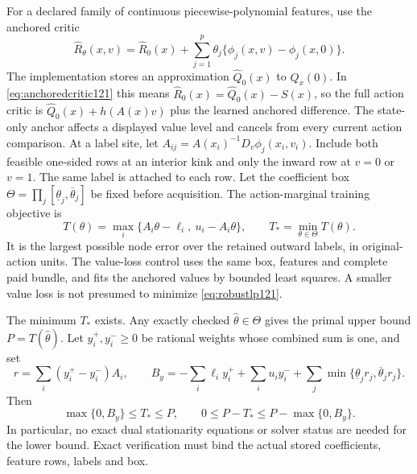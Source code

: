 For a declared family of continuous piecewise-polynomial features,
use the anchored critic
\begin{equation}\label{eq:anchoredcritic121}
 \widehat R_\theta(x,v)=\widehat R_0(x)
       +\sum_{j=1}^p\theta_j
                   \{\phi_j(x,v)-\phi_j(x,0)\}.
\end{equation}
The implementation stores an approximation \(\widehat Q_0(x)\)
to \(Q_x(0)\).  In \eqref{eq:anchoredcritic121} this means
\(\widehat R_0(x)=\widehat Q_0(x)-S(x)\), so the full action
critic is \(\widehat Q_0(x)+h(A(x)v)\) plus the learned
anchored difference.  The state-only anchor affects a displayed
value level and cancels from every current action comparison.
At a label site, let
\(A_{ij}=A(x_i)^{-1}D_v\phi_j(x_i,v_i)\).
Include both feasible one-sided rows at an interior kink and only
the inward row at \(v=0\) or \(v=1\).
The same label is attached to each row.  Let the coefficient box
\(\Theta=\prod_j[\underline\theta_j,\overline\theta_j]\) be fixed
before acquisition.  The action-marginal training objective is
\begin{equation}\label{eq:robustlp121}
 T(\theta)=\max_i\{A_i\theta-\ell_i,\ u_i-A_i\theta\},
 \qquad T_*=\min_{\theta\in\Theta}T(\theta).
\end{equation}
It is the largest possible node error over the retained outward
labels, in original-action units.  The value-loss control uses the
same box, features and complete paid bundle, and fits the anchored
values by bounded least squares.  A smaller value loss is not
presumed to minimize \eqref{eq:robustlp121}.

\begin{proposition}
\label{prop:boxtraining121}
The minimum \(T_*\) exists.  Any exactly checked
\(\widehat\theta\in\Theta\) gives the primal upper bound
\(P=T(\widehat\theta)\).  Let \(y_i^+,y_i^-\geq0\) be rational
weights whose combined sum is one, and set
\[
 r=\sum_i(y_i^+-y_i^-)A_i,\qquad
 B_y=-\sum_i\ell_i y_i^++\sum_i u_i y_i^-
       +\sum_j\min\{\underline\theta_jr_j,
                         \overline\theta_jr_j\}.
 \]
Then
\begin{equation}\label{eq:traininggap121}
 \max\{0,B_y\}\leq T_*\leq P,\qquad
 0\leq P-T_*\leq P-\max\{0,B_y\}.
\end{equation}
In particular, no exact dual stationarity equations or solver
status are needed for the lower bound.  Exact verification must
bind the actual stored coefficients, feature rows, labels and box.
\end{proposition}

